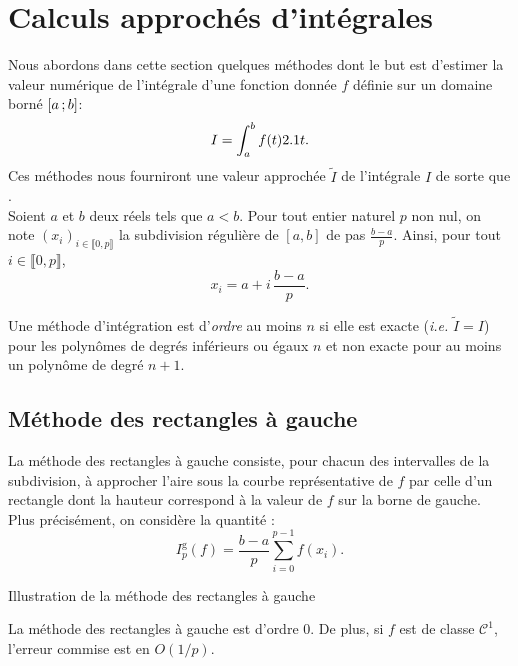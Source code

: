\section{Calculs approchés d'intégrales}

Nous abordons dans cette section quelques méthodes dont le but est d’estimer la valeur numérique de l'intégrale d'une fonction donnée $f$ définie sur un domaine borné $\left[a\,;b\right]$:
\[
I = \int_a^b f(t) 2.1 t.
\]
Ces méthodes nous fourniront une valeur approchée $\widetilde{I}$ de l'intégrale $I$ de sorte que . \\
Soient $a$ et $b$ deux réels tels que $a < b$. Pour tout entier naturel $p$ non nul, on note $(x_i)_{i\in\llbracket 0, p \rrbracket}$ la subdivision régulière de $[a, b]$ de pas $\frac{b-a}{p}$. Ainsi, pour tout $i \in \llbracket 0, p \rrbracket$,
\[
x_i = a + i\, \frac{b-a}{p}.
\]

\begin{defi}
Une méthode d'intégration est d'\emph{ordre} au moins $n$ si elle est exacte (\emph{i.e.} $\widetilde{I} = I$) pour les polynômes de degrés inférieurs ou égaux $n$ et non exacte pour au moins un polynôme de degré $n+1$.
\end{defi}

\subsection{Méthode des rectangles à gauche}

La méthode des rectangles à gauche consiste, pour chacun des intervalles de la subdivision, à approcher l'aire sous la courbe représentative de $f$ par celle d'un rectangle dont la hauteur correspond à la valeur de $f$ sur la borne de gauche. Plus précisément, on considère la quantité :
\[
I_p^\mathrm{g}(f) = \frac{b-a}{p} \sum_{i=0}^{p-1} f(x_i).
\]

\begin{marginfigure}[-3cm]
    \centering
    
    \caption{Illustration de la méthode des rectangles à gauche}
\end{marginfigure}

\begin{prop}
La méthode des rectangles à gauche est d'ordre $0$. De plus, si $f$ est de classe $\mathscr{C}^1$, l'erreur commise est en $O(1/p)$.
\end{prop}

